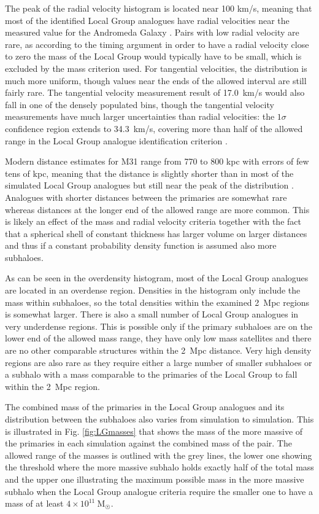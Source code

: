 \documentclass[english, twoside]{HYgradu}
\begin{document}
The peak of the radial velocity histogram is located near 100 km/s, meaning that most of the identified Local Group analogues have radial velocities near the measured value for the Andromeda Galaxy \citep{vandermarel2012m31}. Pairs with low radial velocity are rare, as according to the timing argument in order to have a radial velocity close to zero the mass of the Local Group would typically have to be small, which is excluded by the mass criterion used. For tangential velocities, the distribution is much more uniform, though values near the ends of the allowed interval are still fairly rare. The \citet{vandermarel2012m31} tangential velocity measurement result of 17.0~km/s would also fall in one of the densely populated bins, though the tangential velocity measurements have much larger uncertainties than radial velocities: the $1\sigma$ confidence region extends to 34.3~km/s, covering more than half of the allowed range in the Local Group analogue identification criterion \citep{vandermarel2012m31}.

Modern distance estimates for M31 range from 770 to 800 kpc with errors of few tens of kpc, meaning that the distance is slightly shorter than in most of the simulated Local Group analogues but still near the peak of the distribution \citep{mcconnachie2005distances}. Analogues with shorter distances between the primaries are somewhat rare whereas distances at the longer end of the allowed range are more common. This is likely an effect of the mass and radial velocity criteria together with the fact that a spherical shell of constant thickness has larger volume on larger distances and thus if a constant probability density function is assumed also more subhaloes.

As can be seen in the overdensity histogram, most of the Local Group analogues are located in an overdense region. Densities in the histogram only include the mass within subhaloes, so the total densities within the examined 2~Mpc regions is somewhat larger. There is also a small number of Local Group analogues in very underdense regions. This is possible only if the primary subhaloes are on the lower end of the allowed mass range, they have only low mass satellites and there are no other comparable structures within the 2~Mpc distance. Very high density regions are also rare as they require either a large number of smaller subhaloes or a subhalo with a mass comparable to the primaries of the Local Group to fall within the 2~Mpc region.

The combined mass of the primaries in the Local Group analogues and its distribution between the subhaloes also varies from simulation to simulation. This is illustrated in Fig. \ref{fig:LGmasses} that shows the mass of the more massive of the primaries in each simulation against the combined mass of the pair. The allowed range of the masses is outlined with the grey lines, the lower one showing the threshold where the more massive subhalo holds exactly half of the total mass and the upper one illustrating the maximum possible mass in the more massive subhalo when the Local Group analogue criteria require the smaller one to have a mass of at least $4 \times 10^{11}~\mathrm{M_{\astrosun}}$.
\end{document}
